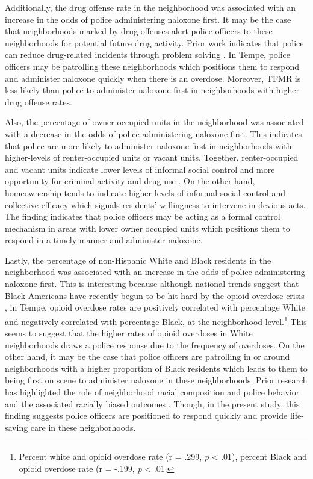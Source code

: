 Additionally, the drug offense rate in the neighborhood was associated with an increase in the odds of police administering naloxone first. It may be the case that neighborhoods marked by drug offenses alert police officers to these neighborhoods for potential future drug activity. Prior work indicates that police can reduce drug-related incidents through problem solving \parencite{mazerolle_street-level_2007}. In Tempe, police officers may be patrolling these neighborhoods which positions them to respond and administer naloxone quickly when there is an overdose. Moreover, TFMR is less likely than police to administer naloxone first in neighborhoods with higher drug offense rates. 

Also, the percentage of owner-occupied units in the neighborhood was associated with a decrease in the odds of police administering naloxone first. This indicates that police are more likely to administer naloxone first in neighborhoods with higher-levels of renter-occupied units or vacant units. Together, renter-occupied and vacant units indicate lower levels of informal social control and more opportunity for criminal activity and drug use \parencite{feldmeyer_community_2022, hannon_neighborhood_2006}. On the other hand, homeownership tends to indicate higher levels of informal social control and collective efficacy \parencite{sampson_neighborhoods_1997} which signals residents' willingness to intervene in devious acts. The finding indicates that police officers may be acting as a formal control mechanism in areas with lower owner occupied units which positions them to respond in a timely manner and administer naloxone.

Lastly, the percentage of non-Hispanic White and Black residents in the neighborhood was associated with an increase in the odds of police administering naloxone first. This is interesting because although national trends suggest that Black Americans have recently begun to be hit hard by the opioid overdose crisis \parencite{humphreys_responding_2022}, in Tempe, opioid overdose rates are positively correlated with percentage White and negatively correlated with percentage Black, at the neighborhood-level.\footnote{Percent white and opioid overdose rate (r = .299, \textit{p} < .01), percent Black and opioid overdose rate (r = -.199, \textit{p} < .01.} This seems to suggest that the higher rates of opioid overdoses in White neighborhoods draws a police response due to the frequency of overdoses. On the other hand, it may be the case that police officers are patrolling in or around neighborhoods with a higher proportion of Black residents which leads to them to being first on scene to administer naloxone in these neighborhoods. Prior research has highlighted the role of neighborhood racial composition and police behavior and the associated racially biased outcomes \parencite{fagan_street_2000, kochel_effect_2011}. Though, in the present study, this finding suggests police officers are positioned to respond quickly and provide life-saving care in these neighborhoods.

